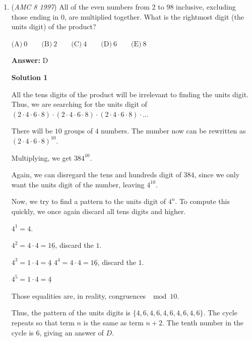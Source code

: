 \begin{enumerate}
 The radii of those three semicircles are $5, 3,$ and $2$, respectively.Thus, the area of the shaded region is $\frac{1}{2}\pi\cdot5^2 + \frac{1}{2}\pi\cdot3^2 - \frac{1}{2}\pi\cdot2^2 =\frac{\pi}{2}(5^2 + 3^2 - 2^2)=15\pi$

 The total area of the circle is $\pi \cdot 5^2 = 25\pi$.Thus, the unshaded area is $25\pi - 15\pi = 10\pi$.Therefore the ratio of shaded:unshaded is $15\pi : 10\pi =\boxed{ \text{(C)}\ 3:2}$.

 


	\item (\textit{AMC 8 1997}) All of the even numbers from 2 to 98 inclusive, excluding those ending in 0, are multiplied together.  What is the rightmost digit (the units digit) of the product?


 $\text{(A)}\ 0 \qquad \text{(B)}\ 2 \qquad \text{(C)}\ 4 \qquad \text{(D)}\ 6 \qquad \text{(E)}\ 8$

 \textbf{Answer: }D



\textbf{Solution 1}

All the tens digits of the product will be irrelevant to finding the units digit.  Thus, we are searching for the units digit of $(2\cdot 4\cdot 6 \cdot 8) \cdot (2 \cdot 4 \cdot 6 \cdot 8) \cdot (2\cdot 4\cdot 6 \cdot 8) \cdot ...$

 There will be $10$ groups of $4$ numbers.  The number now can be rewritten as $(2\cdot 4 \cdot 6 \cdot 8)^{10}$.

 Multiplying, we get $384^{10}$.

 Again, we can disregard the tens and hundreds digit of $384$, since we only want the units digit of the number, leaving $4^{10}$.

 Now, we try to find a pattern to the units digit of $4^n$.  To compute this quickly, we once again discard all tens digits and higher.

 $4^1 = 4$.

 $4^2 = 4\cdot 4 = 1\underline{6}$, discard the $1$.

 $4^3 = 1 \cdot 4 = \underline{4}$
$4^4 = 4 \cdot 4 = 1\underline{6}$, discard the $1$.

 $4^5 = 1 \cdot 4 = \underline{4}$

 Those equalities are, in reality, congruences $\mod {10}$.

 Thus, the pattern of the units digits is $\{4, 6, 4, 6, 4, 6, 4, 6, 4, 6\}$.  The cycle repeats so that term $n$ is the same as term $n+2$.  The tenth number in the cycle is $6$, giving an answer of $\boxed{D}$.


\end{enumerate}

